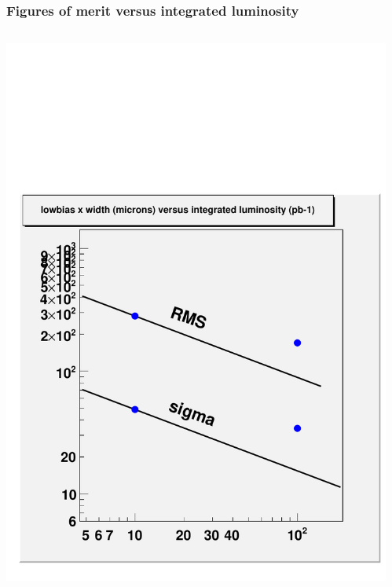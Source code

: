 \documentclass[compress]{beamer}
\begin{document}
\begin{frame}
\frametitle{Figures of merit versus integrated luminosity}
\begin{columns}
\begin{center}
\includegraphics[width=\linewidth]{realplots/lowbias_width_vsevents}
\end{center}
\begin{center}

\end{center}
\end{columns}
\end{frame}
\end{document}

